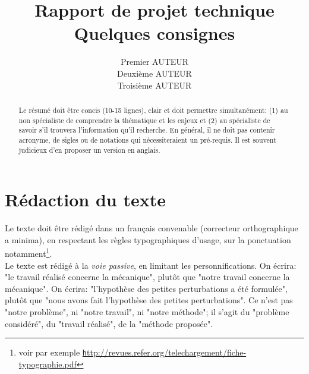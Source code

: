 \documentclass[a4paper,11pt]{paper}
\author{
        Premier AUTEUR\\
        Deuxième AUTEUR\\
        Troisième AUTEUR
}
\title{
	Rapport de projet technique\\
        Quelques consignes
}
\begin{document}
\sffamily



\thispagestyle{empty}
        \begin{abstract}
        \hskip7mm        
        Le résumé doit être concis (10-15 lignes), clair et doit permettre simultanément: (1) au non spécialiste de comprendre la thématique et les enjeux et (2) au spécialiste de savoir s'il trouvera l'information qu'il recherche. En général, il ne doit pas contenir acronyme, de sigles ou de notations qui nécessiteraient un pré-requis. Il est souvent judicieux d'en proposer un version en anglais.          
        \end{abstract}

\newpage

\tableofcontents
\thispagestyle{empty}
\newpage
\thispagestyle{empty}
\listoffigures
\listoftables
\clearpage
\newpage



\setcounter{page}{1}

\section{Rédaction du texte}

Le texte doit être rédigé dans un français convenable (correcteur orthographique a minima), en respectant les règles typographiques d'usage, sur la ponctuation notamment\footnote{voir par exemple \href{http://revues.refer.org/telechargement/fiche-typographie.pdf}{\texttt http://revues.refer.org/telechargement/fiche-typographie.pdf}}. \\

Le texte est rédigé à la \emph{voie passive}, en limitant les personnifications. On écrira: "le travail réalisé concerne la mécanique", plutôt que "notre travail concerne la mécanique". On écrira: "l'hypothèse des petites perturbations a été formulée", plutôt que "nous avons fait l'hypothèse des petites perturbations". Ce n'est pas "notre problème", ni "notre travail", ni "notre méthode"; il s'agit du "problème considéré", du "travail réalisé", de la "méthode proposée".  \\
\end{document}

